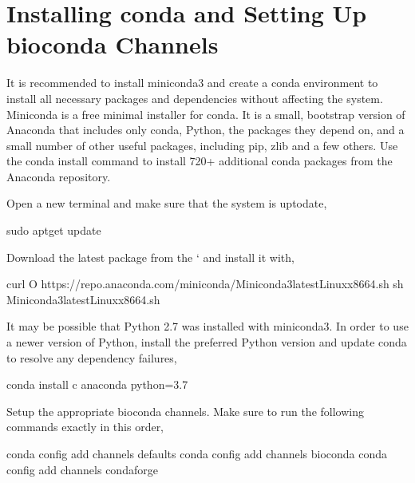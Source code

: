 \documentclass[letterpaper,10pt,english]{sphinxhowto}
\begin{document}
\section{Installing conda and Setting Up bioconda Channels}
\label{\detokenize{index:installing-conda-and-setting-up-bioconda-channels}}
It is recommended to install miniconda3 and create a conda environment to install all necessary packages and dependencies without affecting the system. Miniconda is a free minimal installer for conda. It is a small, bootstrap version of Anaconda that includes only conda, Python, the packages they depend on, and a small number of other useful packages, including pip, zlib and a few others. Use the conda install command to install 720+ additional conda packages from the Anaconda repository.

Open a new terminal  and make sure that the system is up\sphinxhyphen{}to\sphinxhyphen{}date,

\begin{sphinxVerbatim}[commandchars=\\\{\}]
\PYGZdl{} sudo apt\PYGZhy{}get update
\end{sphinxVerbatim}

Download the latest package from the ‘ and install it with,

\begin{sphinxVerbatim}[commandchars=\\\{\}]
\PYGZdl{} curl \PYGZhy{}O https://repo.anaconda.com/miniconda/Miniconda3\PYGZhy{}latest\PYGZhy{}Linux\PYGZhy{}x86\PYGZus{}64.sh
\PYGZdl{} sh Miniconda3\PYGZhy{}latest\PYGZhy{}Linux\PYGZhy{}x86\PYGZus{}64.sh
\end{sphinxVerbatim}

It may be possible that Python 2.7 was installed with miniconda3. In order to use a newer version of Python, install the preferred Python version and update conda to resolve any dependency failures,

\begin{sphinxVerbatim}[commandchars=\\\{\}]
\PYGZdl{} conda install \PYGZhy{}c anaconda python=3.7
\end{sphinxVerbatim}

Setup the appropriate bioconda channels. Make sure to run the following commands exactly in this order,

\begin{sphinxVerbatim}[commandchars=\\\{\}]
\PYGZdl{} conda config \PYGZhy{}\PYGZhy{}add channels defaults
\PYGZdl{} conda config \PYGZhy{}\PYGZhy{}add channels bioconda
\PYGZdl{} conda config \PYGZhy{}\PYGZhy{}add channels conda\PYGZhy{}forge
\end{sphinxVerbatim}
\end{document}
